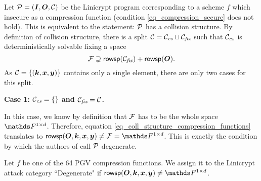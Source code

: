 Let $\P = (\I, \O, \C)$ be the Linicrypt program corresponding to a scheme $f$ which insecure as a compression function
(condition \eqref{eq_compression_secure} does not hold).
This is equivalent to the statement:
$\P$ has a collision structure.
By definition of collision structure,
there is a split $\C = \Ccs \sqcup \Cfix$ such that $\Ccs$ is deterministically solvable fixing a space
\begin{equation}
\label{eq_coll_structure_compression_functions}
\Fix \supsetneq \rowsp(\Cfix) + \rowsp(\O).
\end{equation}
As $\C = \{(\vk, \vx, \vy)\}$ contains only a single element,
there are only two cases for this split.

\textbf{Case 1: $\Ccs = \{\}$ and $\Cfix = \C$.}

In this case, we know by definition that $\Fix$ has to be the whole space $\Frowsp$.
Therefore, equation \ref{eq_coll_structure_compression_functions} translates to
$\rowsp(\O, \vk, \vx, \vy) \neq \Fix = \Frowsp$.
This is exactly the condition by which the authors of \cite{TCC:McQSwoRos19} call $\P$ degenerate.

\begin{defn}
    Let $f$ be one of the 64 PGV compression functions.
    We assign it to the Linicrypt attack category ``Degenerate" if $\rowsp(\O,\vk,\vx,\vy) \neq \Frowsp$.
\end{defn}

